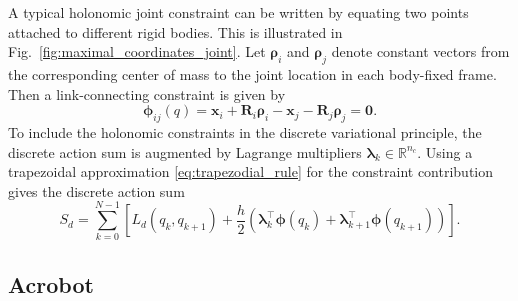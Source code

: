 A typical holonomic joint constraint can be written by equating two points
attached to different rigid bodies. This is illustrated in
Fig.~\ref{fig:maximal_coordinates_joint}. Let \(\bm{\rho}_i\) and \(\bm{\rho}_j\) denote
constant vectors from the corresponding center of mass to the joint location in
each body-fixed frame. Then a link-connecting constraint is given by
\begin{equation}
    \bm{\phi}_{ij}(q)
    =
    \bm{x}_i+\bm{R}_i\bm{\rho}_i
    -
    \bm{x}_j-\bm{R}_j\bm{\rho}_j
    =
    \bm{0}.
    \label{eq:general_joint_constraint_maximal}
\end{equation}
To include the holonomic constraints in the discrete variational principle, the
discrete action sum is augmented by Lagrange multipliers
\(\bm{\lambda}_k\in\mathbb{R}^{n_c}\). Using a trapezoidal approximation \eqref{eq:trapezodial_rule} for the
constraint contribution gives the discrete action sum
\begin{equation}
    S_{d}
    =
    \sum_{k=0}^{N-1}
    \left[
    L_d(q_k,q_{k+1})
    +
    \frac{h}{2}
    \left(
    \bm{\lambda}_k^\top \bm{\phi}(q_k)
    +
    \bm{\lambda}_{k+1}^\top \bm{\phi}(q_{k+1})
    \right)
    \right].
    \label{eq:constrained_discrete_action}
\end{equation}

\subsection{Acrobot}
\label{subsection:discrete_Acrobot}

